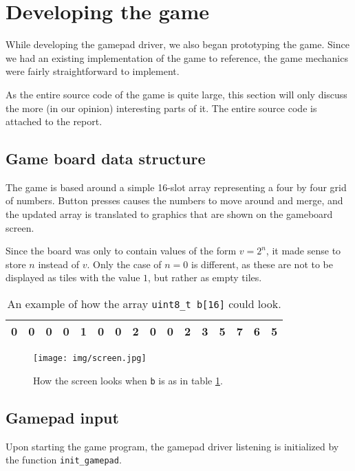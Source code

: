 \newpage
\section{Developing the game}
While developing the gamepad driver, we also began prototyping the game.
Since we had an existing implementation of the game \cite{2048} to reference,
the game mechanics were fairly straightforward to implement.

As the entire source code of the game is quite large, this section will only discuss the more (in our opinion) interesting parts of it.
The entire source code is attached to the report.

\subsection{Game board data structure\label{data_structure}}
The game is based around a simple 16-slot array representing a four by four grid of numbers.
Button presses causes the numbers to move around and merge,
and the updated array is translated to graphics that are shown on the gameboard screen.

Since the board was only to contain values of the form $v = 2^n$, it made sense to store $n$ instead of $v$. Only the case of $n = 0$ is different, as these are not to be displayed as tiles with the value $1$, but rather as empty tiles.

\begin{table}[h!]
    \centering
    \begin{tabular}{|l|l|l|l|l|l|l|l|l|l|l|l|l|l|l|l|}
        \hline
        0 & 0 & 0 & 0 &
        1 & 0 & 0 & 2 &
        0 & 0 & 2 & 3 &
        5 & 7 & 6 & 5 \\ \hline
    \end{tabular}
    \caption{An example of how the array \texttt{uint8\_t b[16]} could look.}
    \label{array_b}
\end{table}

\begin{figure}[h!]
    \centering
    \texttt{[image: img/screen.jpg]}
    \caption{How the screen looks when \texttt{b} is as in table \ref{array_b}.}
\end{figure}

\newpage
\subsection{Gamepad input}
Upon starting the game program, the gamepad driver listening is initialized by the function \texttt{init\_gamepad}.

